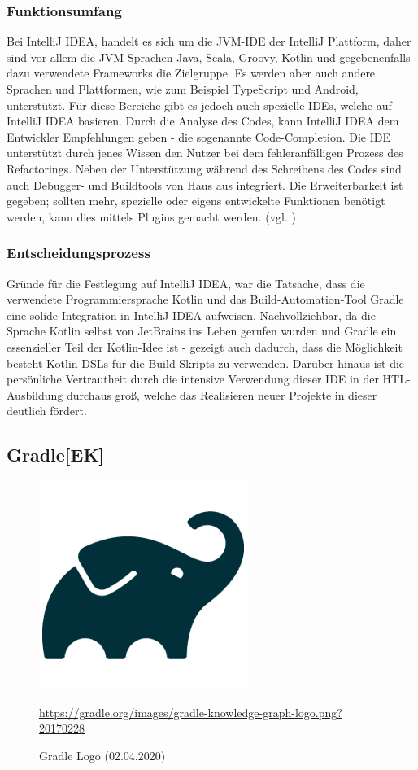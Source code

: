 \subsubsection{Funktionsumfang}
Bei IntelliJ IDEA, handelt es sich um die JVM-IDE der IntelliJ Plattform, daher sind vor allem die JVM Sprachen Java, Scala, Groovy, Kotlin  und gegebenenfalls dazu verwendete Frameworks die Zielgruppe. Es werden aber auch andere Sprachen und Plattformen, wie zum Beispiel TypeScript und Android, unterstützt. Für diese Bereiche gibt es jedoch auch spezielle IDEs, welche auf IntelliJ IDEA basieren. Durch die Analyse des Codes, kann IntelliJ IDEA dem Entwickler Empfehlungen geben - die sogenannte Code-Completion. Die IDE unterstützt durch jenes Wissen den Nutzer bei dem fehleranfälligen Prozess des Refactorings. Neben der Unterstützung während des Schreibens des Codes sind auch Debugger- und Buildtools von Haus aus integriert. Die Erweiterbarkeit ist gegeben; sollten mehr, spezielle oder eigens entwickelte Funktionen benötigt werden, kann dies mittels Plugins gemacht werden.
(vgl. \cite{JetBrains-IDEA})
\subsubsection{Entscheidungsprozess}
Gründe für die Festlegung auf IntelliJ IDEA, war die Tatsache, dass die verwendete Programmiersprache Kotlin und das Build-Automation-Tool Gradle eine solide Integration in IntelliJ IDEA aufweisen. Nachvollziehbar, da die Sprache Kotlin selbst von JetBrains ins Leben gerufen wurden und Gradle ein essenzieller Teil der Kotlin-Idee ist - gezeigt auch dadurch, dass  die Möglichkeit besteht Kotlin-DSLs für die Build-Skripts zu verwenden. Darüber hinaus ist die persönliche Vertrautheit durch die intensive Verwendung dieser IDE in der HTL-Ausbildung durchaus groß, welche das Realisieren neuer Projekte in dieser deutlich fördert.

\subsection{Gradle[EK]}
\begin{figure}[H]
\centering
  \includegraphics[scale=0.5]{images/gradle-logo.png}
  \caption{Gradle Logo (02.04.2020)}
  \url{https://gradle.org/images/gradle-knowledge-graph-logo.png?20170228}
\end{figure}
